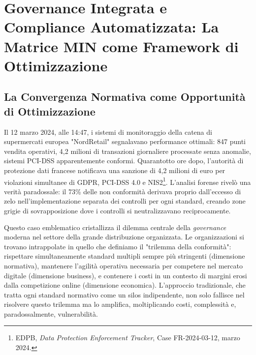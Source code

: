 

\newtheorem{theorem}{Teorema}
\newtheorem{lemma}{Lemma}

\chapter{Governance Integrata e Compliance Automatizzata: La Matrice MIN come Framework di Ottimizzazione}
\label{cap4_compliance_integration}

\section{La Convergenza Normativa come Opportunità di Ottimizzazione}

Il 12 marzo 2024, alle 14:47, i sistemi di monitoraggio della catena di supermercati europea "NordRetail" segnalavano performance ottimali: 847 punti vendita operativi, 4,2 milioni di transazioni giornaliere processate senza anomalie, sistemi PCI-DSS apparentemente conformi. Quarantotto ore dopo, l'autorità di protezione dati francese notificava una sanzione di 4,2 milioni di euro per violazioni simultanee di GDPR, PCI-DSS 4.0 e NIS2\footnote{EDPB, \textit{Data Protection Enforcement Tracker}, Case FR-2024-03-12, marzo 2024.}. L'analisi forense rivelò una verità paradossale: il 73\% delle non conformità derivava proprio dall'eccesso di zelo nell'implementazione separata dei controlli per ogni standard, creando zone grigie di sovrapposizione dove i controlli si neutralizzavano reciprocamente.

Questo caso emblematico cristallizza il dilemma centrale della \textit{governance} moderna nel settore della grande distribuzione organizzata. Le organizzazioni si trovano intrappolate in quello che definiamo il "trilemma della conformità": rispettare simultaneamente standard multipli sempre più stringenti (dimensione normativa), mantenere l'agilità operativa necessaria per competere nel mercato digitale (dimensione business), e contenere i costi in un contesto di margini erosi dalla competizione online (dimensione economica). L'approccio tradizionale, che tratta ogni standard normativo come un silos indipendente, non solo fallisce nel risolvere questo trilemma ma lo amplifica, moltiplicando costi, complessità e, paradossalmente, vulnerabilità.

